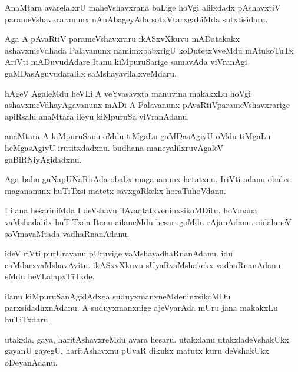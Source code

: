 \documentclass{article}
\begin{document}
\begin{mn}
AnaMtara avarelalxrU maheVshavxrana baLige hoVgi alilxdadx pAshavxtiV
parameVshavxraranunx nAnAbageyAda sotxVtarxgaLiMda sutxtisidaru.
\end{mn}

\begin{mn}%
Aga A pAvaRtiV parameVshavxraru ikASxvXkuvu mADatakakx ashavxmeVdhada
Palavanunx namimxbabxrigU koDutetxVveMdu mAtukoTuTx AriVti
mADuvudAdare Itanu kiMpuruSarige samavAda viVranAgi
gaMDasAguvudaralilx saMshayavilalxveMdaru.
\end{mn}

\begin{mn}
hAgeV AgaleMdu heVLi A veYvasavxta manuvina makakxLu hoVgi
ashavxmeVdhayAgavanunx mADi A Palavanunx pAvaRtiVparameVshavxrarige
apiRsalu anaMtara ileyu kiMpuruSa viVranAdanu.
\end{mn}

\begin{mn}
anaMtara A kiMpuruSanu oMdu tiMgaLu gaMDasAgiyU oMdu tiMgaLu
heMgasAgiyU irutitxdadxnu. budhana maneyalilxruvAgaleV gaBiRNiyAgidadxnu.
\end{mn}

\begin{mn}
Aga bahu guNapUNaRnAda obabx magananunx hetatxnu. IriVti adanu obabx
magananunx huTiTxsi matetx savxgaRkekx horaTuhoVdanu.
\end{mn}

\begin{mn}
I ilana hesariniMda I deVshavu ilAvaqtatxveninxsikoMDitu. hoVmana
vaMshadalilx huTiTxda Itanu ailaneMdu hesarugoMdu
rAjanAdanu. aidalaneV soVmavaMtada vadhaRnanAdanu.
\end{mn}

\begin{mn}%
ideV riVti purUravanu pUruvige vaMshavadhaRnanAdanu. idu
caMdarxvaMshavAyitu. ikASxvXkuvu sUyaRvaMshakekx vadhaRnanAdanu eMdu heVLalapxTiTxde.
\end{mn}

\begin{mn}
ilanu kiMpuruSanAgidAdxga suduyxmanxneMdeninxsikoMDu
parxsidadhxnAdanu. A suduyxmanxnige ajeVyarAda mUru jana makakxLu huTiTxdaru.
\end{mn}

\begin{mn}
utakxla, gaya, haritAshavxreMdu avara hesaru. utakxlanu
utakxladeVshakUkx gayanU gayegU, haritAshavxnu pUvaR dikukx matutx
kuru deVshakUkx oDeyanAdanu.
\end{mn}
\end{document}
